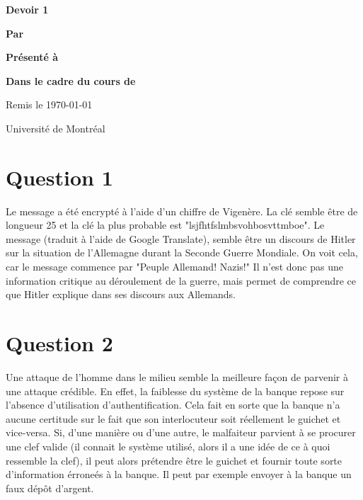 \documentclass[letterpaper,12pt]{scrartcl}
\begin{document}
	\begin{center}
		\vspace{2cm}

		{\Huge\bf\sf Devoir 1}

		\vspace{4cm}

		{\bf\sf Par}

		\vspace{0.5cm}{\large\bf\sf François Poitras}

		\vspace{2cm}

		{\bf\sf Présenté à}

		\vspace{0.5cm}{\large\bf\sf M. Alain Tapp}

		\vspace{2cm}

		{\bf\sf Dans le cadre du cours de}

		\vspace{0.5cm}{\large\bf\sf Sécurité informatique (IFT3275)}

		\vspace{\fill}
		Remis le \today

		\vspace{0.5cm}Université de Montréal
	\end{center}
	
	\newpage

	\pagestyle{cb}

	\newpage
	
	\section*{Question 1}
	Le message a été encrypté à l'aide d'un chiffre de Vigenère. La clé  semble être de longueur 25 et la clé la plus probable est "lsjfhtfslmbsvohbosvttmboe". Le message (traduit à l'aide de Google Translate), semble être un discours de Hitler sur la situation de l'Allemagne durant la Seconde Guerre Mondiale. On voit cela, car le message commence par "Peuple Allemand! Nazis!" Il n'est donc pas une information critique au déroulement de la guerre, mais permet de comprendre ce que Hitler explique dans ses discours aux Allemands. 
	\section*{Question 2}
	Une attaque de l'homme dans le milieu semble la meilleure façon de parvenir à une attaque crédible. En effet, la faiblesse du système de la banque repose sur l'absence d'utilisation d'authentification. Cela fait en sorte que la banque n'a aucune certitude sur le fait que son interlocuteur soit réellement le guichet et vice-versa. Si, d'une manière ou d'une autre, le malfaiteur parvient à se procurer une clef valide (il connait le système utilisé, alors il a une idée de ce à quoi ressemble la clef), il peut alors prétendre être le guichet et fournir toute sorte d'information érroneés à la banque. Il peut par exemple envoyer à la banque un faux dépôt d'argent.
\end{document}
